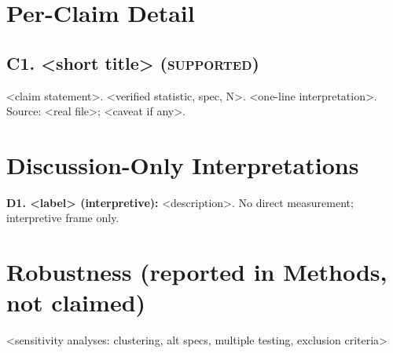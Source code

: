 \documentclass[11pt]{article}
\newcommand{\status}[1]{\textsc{#1}}
\newcommand{\supported}{\textcolor{green!50!black}{\status{supported}}}
\begin{document}
\section*{Per-Claim Detail}

\subsection*{C1. <short title> (\supported)}

<claim statement>.
%
<verified statistic, spec, N>.
%
<one-line interpretation>.
%
Source: <real file>; <caveat if any>.


\section*{Discussion-Only Interpretations}

\textbf{D1. <label> (interpretive):} <description>. No direct measurement; interpretive frame only.

\section*{Robustness (reported in Methods, not claimed)}

<sensitivity analyses: clustering, alt specs, multiple testing, exclusion criteria>

\end{document}
